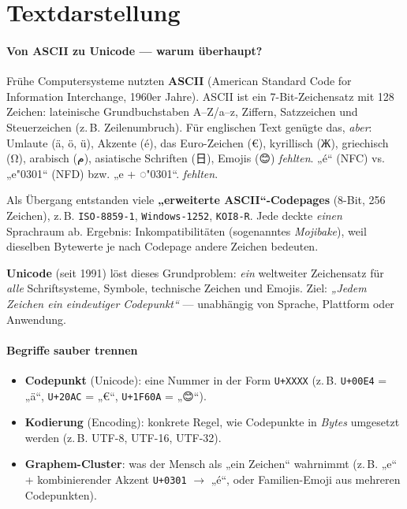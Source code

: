 \documentclass[12pt,a4paper]{book}
\newcommand{\dottedcircle}{{\SymbolsFallback ◌}} %
\newcommand{\combacute}{\char"0301}              %
\begin{document}
\section{Textdarstellung}

\paragraph{Von ASCII zu Unicode — warum überhaupt?}
Frühe Computersysteme nutzten \textbf{ASCII} (American Standard Code for Information Interchange, 1960er Jahre). ASCII ist ein 7-Bit-Zeichensatz mit 128 Zeichen: lateinische Grundbuchstaben A–Z/a–z, Ziffern, Satzzeichen und Steuerzeichen (z.\,B. Zeilenumbruch). Für englischen Text genügte das, \emph{aber}:
Umlaute (ä, ö, ü), Akzente (é), das Euro-Zeichen (€), kyrillisch (Ж), griechisch (Ω), arabisch ({\arabicfont م}), asiatische Schriften ({\cjkfont 日}), Emojis ({\emojifont 😊}) \emph{fehlten}.
„é“ (NFC) vs. „e\combacute“ (NFD) bzw. „e + \dottedcircle\combacute“.
 \emph{fehlten}.


Als Übergang entstanden viele \textbf{„erweiterte ASCII“-Codepages} (8-Bit, 256 Zeichen), z.\,B. \texttt{ISO-8859-1}, \texttt{Windows-1252}, \texttt{KOI8-R}. Jede deckte \emph{einen} Sprachraum ab. Ergebnis: Inkompatibilitäten (sogenanntes \emph{Mojibake}), weil dieselben Bytewerte je nach Codepage andere Zeichen bedeuten.

\textbf{Unicode} (seit 1991) löst dieses Grundproblem: \emph{ein} weltweiter Zeichensatz für \emph{alle} Schriftsysteme, Symbole, technische Zeichen und Emojis. Ziel: \emph{„Jedem Zeichen ein eindeutiger Codepunkt“} — unabhängig von Sprache, Plattform oder Anwendung.

\paragraph{Begriffe sauber trennen}
\begin{itemize}
	\item \textbf{Codepunkt} (Unicode): eine Nummer in der Form \texttt{U+XXXX} (z.\,B. \texttt{U+00E4} = „ä“, \texttt{U+20AC} = „€“, \texttt{U+1F60A} = „😊“).
	\item \textbf{Kodierung} (Encoding): konkrete Regel, wie Codepunkte in \emph{Bytes} umgesetzt werden (z.\,B. UTF-8, UTF-16, UTF-32).
	\item \textbf{Graphem-Cluster}: was der Mensch als „ein Zeichen“ wahrnimmt (z.\,B. „e“ + kombinierender Akzent \texttt{U+0301} $\to$ „é“, oder Familien-Emoji aus mehreren Codepunkten).
\end{itemize}
\end{document}
